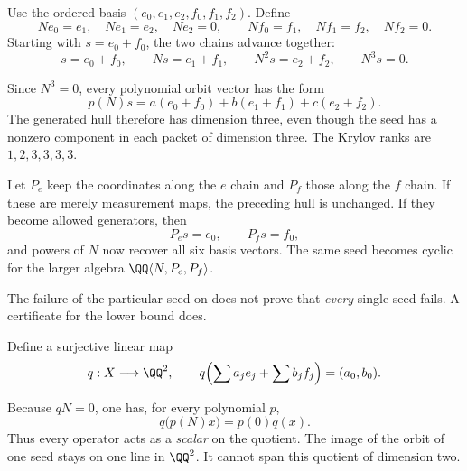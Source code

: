Use the ordered basis $(e_0,e_1,e_2,f_0,f_1,f_2)$. Define
\[
Ne_0=e_1,\quad Ne_1=e_2,\quad Ne_2=0,
\qquad Nf_0=f_1,\quad Nf_1=f_2,\quad Nf_2=0.
\]
Starting with $s=e_0+f_0$, the two chains advance together:
\[
s=e_0+f_0,\qquad Ns=e_1+f_1,\qquad N^2s=e_2+f_2,\qquad N^3s=0.
\]


Since $N^3=0$, every polynomial orbit vector has the form
\[
p(N)s=a(e_0+f_0)+b(e_1+f_1)+c(e_2+f_2).
\]
The generated hull therefore has dimension three, even though the seed has a nonzero component in each packet of dimension three. The Krylov ranks are $1,2,3,3,3,3$.

Let $P_e$ keep the coordinates along the $e$ chain and $P_f$ those along the $f$ chain. If these are merely measurement maps, the preceding hull is unchanged. If they become allowed generators, then
\[
P_es=e_0,\qquad P_fs=f_0,
\]
and powers of $N$ now recover all six basis vectors. The same seed becomes cyclic for the larger algebra $\QQ\langle N,P_e,P_f\rangle$.


The failure of the particular seed on  does not prove that \emph{every} single seed fails. A certificate for the lower bound does.

Define a surjective linear map
\[
q:X\longrightarrow\QQ^2,\qquad
q\Bigl(\sum a_je_j+\sum b_jf_j\Bigr)=(a_0,b_0).
\]


Because $qN=0$, one has, for every polynomial $p$,
\[
q\bigl(p(N)x\bigr)=p(0)q(x).
\]
Thus every operator acts as a \emph{scalar} on the quotient. The image of the orbit of one seed stays on one line in $\QQ^2$. It cannot span this quotient of dimension two.

